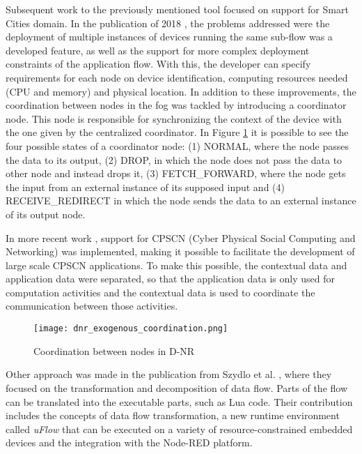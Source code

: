 Subsequent work to the previously mentioned tool focused on support for Smart Cities domain. In the publication of 2018 \cite{fog_at_the_edge}, the problems addressed were the deployment of multiple instances of devices running the same sub-flow was a developed feature, as well as the support for more complex deployment constraints of the application flow. With this, the developer can specify requirements for each node on device identification, computing resources needed (CPU and memory) and physical location. In addition to these improvements, the coordination between nodes in the fog was tackled by introducing a coordinator node. This node is responsible for synchronizing the context of the device with the one given by the centralized coordinator. In Figure \ref{fig:coordination_dnr} it is possible to see the four possible states of a coordinator node: (1) NORMAL, where the node passes the data to its output, (2) DROP, in which the node does not pass the data to other node and instead drops it, (3) FETCH\_FORWARD, where the node gets the input from an external instance of its supposed input and (4) RECEIVE\_REDIRECT in which the node sends the data to an external instance of its output node.

In more recent work \cite{exogenous_coordination}, support for CPSCN (Cyber Physical Social Computing and Networking) was implemented, making it possible to facilitate the development of large scale CPSCN applications. To make this possible, the contextual data and application data were separated, so that the application data is only used for computation activities and the contextual data is used to coordinate the communication between those activities.

\begin{figure}[h]
\caption{Coordination between nodes in D-NR \cite{fog_at_the_edge}}
\label{fig:coordination_dnr}
\centering
\texttt{[image: dnr\_exogenous\_coordination.png]}
\end{figure}

Other approach was made in the publication from Szydlo et al. \cite{flow_based_programming_fog}, where they focused on the transformation and decomposition of data flow. Parts of the flow can be translated into the executable parts, such as Lua code. Their contribution includes the concepts of data flow transformation, a new runtime environment called \textit{uFlow} that can be executed on a variety of resource-constrained embedded devices and the integration with the Node-RED platform. 

